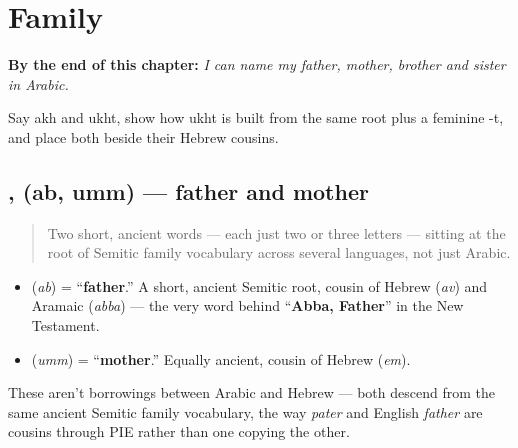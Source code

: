 
\chapter{Family}
\label{ch:ar-family}

\begin{chapteropening}
\textbf{By the end of this chapter:} \emph{I can name my father, mother, brother and sister in Arabic.}

Say akh and ukht, show how ukht is built from the same root plus a feminine -t, and place both beside their Hebrew cousins.
\end{chapteropening}

\section[\texorpdfstring{\ar{أب} \ar{أم} (ab umm)}{أب أم (ab umm)}]{,  (ab, umm) — father and mother}

\label{lesson:AR-C10-ab-umm}



\begin{quote}
Two short, ancient words — each just two or three letters — sitting at the root of Semitic family vocabulary across several languages, not just Arabic.
\end{quote}

\begin{cousinweb}
\begin{itemize}
\raggedright
  \item \textbf{} (\emph{ab}) = \textquotedblleft{}\textbf{father}.\textquotedblright{} A short, ancient Semitic root, cousin of Hebrew \textbf{} (\emph{av}) and Aramaic \textbf{} (\emph{abba}) — the very word behind \textquotedblleft{}\textbf{Abba, Father}\textquotedblright{} in the New Testament.
  \item \textbf{} (\emph{umm}) = \textquotedblleft{}\textbf{mother}.\textquotedblright{} Equally ancient, cousin of Hebrew \textbf{} (\emph{em}).
\end{itemize}

These aren't borrowings between Arabic and Hebrew — both descend from the same ancient Semitic family vocabulary, the way \emph{pater} and English \emph{father} are cousins through PIE rather than one copying the other.
\end{cousinweb}


